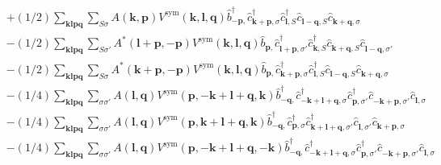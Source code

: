 \begin{align*}
	&+(1/2) \sum_{ \mathbf{k} \mathbf{l} \mathbf{p} \mathbf{q} } \sum_{ S \sigma } A( \mathbf{k}, \mathbf{p} )  V^\mathrm{sym}( \mathbf{k}, \mathbf{l}, \mathbf{q} )   \hat{b}_{ -\mathbf{p}, }^\dagger  \hat{c}_{ \mathbf{k}+\mathbf{p}, \sigma }^\dagger  \hat{c}_{ \mathbf{l}, S }^\dagger  \hat{c}_{ \mathbf{l}-\mathbf{q}, S }^{\phantom{\dagger}} \hat{c}_{ \mathbf{k}+\mathbf{q}, \sigma }^{\phantom{\dagger}}  \\
	&-(1/2) \sum_{ \mathbf{k} \mathbf{l} \mathbf{p} \mathbf{q} } \sum_{ S \sigma' } A^*( \mathbf{l}+\mathbf{p}, -\mathbf{p} )  V^\mathrm{sym}( \mathbf{k}, \mathbf{l}, \mathbf{q} )   \hat{b}_{ \mathbf{p}, }^{\phantom{\dagger}} \hat{c}_{ \mathbf{l}+\mathbf{p}, \sigma' }^\dagger  \hat{c}_{ \mathbf{k}, S }^\dagger  \hat{c}_{ \mathbf{k}+\mathbf{q}, S }^{\phantom{\dagger}} \hat{c}_{ \mathbf{l}-\mathbf{q}, \sigma' }^{\phantom{\dagger}}  \\
	&-(1/2) \sum_{ \mathbf{k} \mathbf{l} \mathbf{p} \mathbf{q} } \sum_{ S \sigma } A^*( \mathbf{k}+\mathbf{p}, -\mathbf{p} )  V^\mathrm{sym}( \mathbf{k}, \mathbf{l}, \mathbf{q} )   \hat{b}_{ \mathbf{p}, }^{\phantom{\dagger}} \hat{c}_{ \mathbf{k}+\mathbf{p}, \sigma }^\dagger  \hat{c}_{ \mathbf{l}, S }^\dagger  \hat{c}_{ \mathbf{l}-\mathbf{q}, S }^{\phantom{\dagger}} \hat{c}_{ \mathbf{k}+\mathbf{q}, \sigma }^{\phantom{\dagger}}  \\
	&-(1/4) \sum_{ \mathbf{k} \mathbf{l} \mathbf{p} \mathbf{q} } \sum_{ \sigma \sigma' } A( \mathbf{l}, \mathbf{q} )  V^\mathrm{sym}( \mathbf{p}, -\mathbf{k}+\mathbf{l}+\mathbf{q}, \mathbf{k} )   \hat{b}_{ -\mathbf{q}, }^\dagger  \hat{c}_{ -\mathbf{k}+\mathbf{l}+\mathbf{q}, \sigma }^\dagger  \hat{c}_{ \mathbf{p}, \sigma' }^\dagger  \hat{c}_{ -\mathbf{k}+\mathbf{p}, \sigma' }^{\phantom{\dagger}} \hat{c}_{ \mathbf{l}, \sigma }^{\phantom{\dagger}}  \\
	&-(1/4) \sum_{ \mathbf{k} \mathbf{l} \mathbf{p} \mathbf{q} } \sum_{ \sigma \sigma' } A( \mathbf{l}, \mathbf{q} )  V^\mathrm{sym}( \mathbf{p}, \mathbf{k}+\mathbf{l}+\mathbf{q}, \mathbf{k} )   \hat{b}_{ -\mathbf{q}, }^\dagger  \hat{c}_{ \mathbf{p}, \sigma }^\dagger  \hat{c}_{ \mathbf{k}+\mathbf{l}+\mathbf{q}, \sigma' }^\dagger  \hat{c}_{ \mathbf{l}, \sigma' }^{\phantom{\dagger}} \hat{c}_{ \mathbf{k}+\mathbf{p}, \sigma }^{\phantom{\dagger}}  \\
	&-(1/4) \sum_{ \mathbf{k} \mathbf{l} \mathbf{p} \mathbf{q} } \sum_{ \sigma \sigma' } A( \mathbf{l}, \mathbf{q} )  V^\mathrm{sym}( \mathbf{p}, -\mathbf{k}+\mathbf{l}+\mathbf{q}, -\mathbf{k} )   \hat{b}_{ -\mathbf{q}, }^\dagger  \hat{c}_{ -\mathbf{k}+\mathbf{l}+\mathbf{q}, \sigma }^\dagger  \hat{c}_{ \mathbf{p}, \sigma' }^\dagger  \hat{c}_{ -\mathbf{k}+\mathbf{p}, \sigma' }^{\phantom{\dagger}} \hat{c}_{ \mathbf{l}, \sigma }^{\phantom{\dagger}}  \\

\end{align*}
